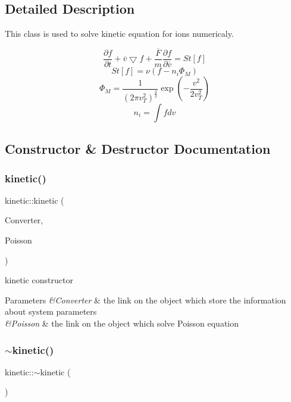 \subsection{Detailed Description}
This class is used to solve kinetic equation for ions numericaly. 

\[ \frac{\partial f}{\partial t} + \overline{v}\bigtriangledown f+\frac{\overline{F}}{m}\frac{\partial f}{\partial \overline{v}}=St[f] \] \[ St[f] = \nu (f - n_i \Phi_M) \] \[ \Phi_M = \frac{1}{(2 \pi v_T^2)^{\frac{3}{2}}} \exp(-\frac{v^2}{2v_T^2}) \] \[ n_i = \int f dv \] 

\subsection{Constructor \& Destructor Documentation}
\mbox{\label{classkinetic_a9cb6588c4a9e87619ed78269299e07ca}} 
\subsubsection{\texorpdfstring{kinetic()}{kinetic()}}
{\footnotesize\ttfamily kinetic\+::kinetic (\begin{DoxyParamCaption}\item[{const \mbox{\hyperlink{classconverter}{converter}} \&}]{Converter,  }\item[{const \mbox{\hyperlink{classpoisson}{poisson}} \&}]{Poisson }\end{DoxyParamCaption})}



kinetic constructor 


\begin{DoxyParams}{Parameters}
{\em \&\+Converter} & the link on the object which store the information about system parameters \\
\hline
{\em \&\+Poisson} & the link on the object which solve Poisson equation \\
\hline
\end{DoxyParams}
\mbox{\label{classkinetic_a68a20ffcf1b59f154d2ca37c9776f35a}} 
\subsubsection{\texorpdfstring{$\sim$kinetic()}{~kinetic()}}
{\footnotesize\ttfamily kinetic\+::$\sim$kinetic (\begin{DoxyParamCaption}{ }\end{DoxyParamCaption})}



